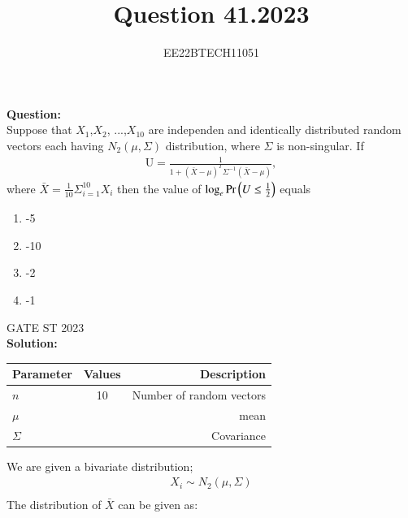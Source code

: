 \documentclass[journal,12pt,onecolumn]{IEEEtran}
\theoremstyle{remark}
\begin{document}

\vspace{3cm}


\title{Question 41.2023}
\author{EE22BTECH11051}

\maketitle
\vspace{3cm}

\textbf{Question:} \\
Suppose that $X_1$,$X_2$, ...,$X_{10}$ are independen and identically distributed random vectors each having
$N_2(\mu,\Sigma)$ distribution, where $\Sigma$ is non-singular. If
\begin{align}
    \text{U} = \frac{1}{1+(\bar{X} - \mu)^T\Sigma^{-1}(\bar{X} - \mu)} ,
\end{align}
where $\bar X = \frac{1}{10}\Sigma_{i = 1}^{10} X_{i}$ then the value of $\log_e \Pr\left(U \le \frac{1}{2}\right)$ equals

\begin{enumerate}
    \item -5
    \item -10
    \item -2
    \item -1
\end{enumerate}
\hfill {GATE ST 2023}\\
\textbf{Solution:}\\
\begin{table}[h!]
    \begin{center}
       \begin{tabular}{|l|c|r|}
       \hline
       Parameter & Values & Description\\
       \hline
       $n$ & 10 & Number of random vectors\\
       \hline
       $\mu$ &  & mean\\
       \hline
       $\Sigma$ &  & Covariance\\
       \hline
       \end{tabular}
       \end{center}
   \end{table}
   
We are given a bivariate distribution;
\begin{align}
    X_{i} \sim N_2(\mu,\Sigma)\\
\end{align}
The distribution of $\bar{X}$ can be given as: \\
\end{document}
